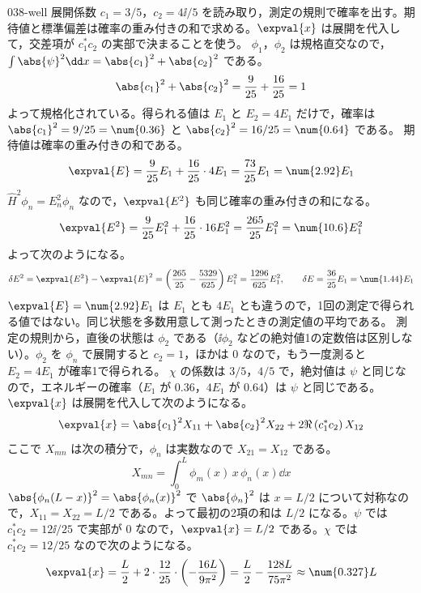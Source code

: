 \documentclass[uplatex,dvipdfmx,a4paper,11pt]{jsarticle}
\begin{document}
\kaitouhen
{}
\begin{kaisetsu}{038-well}
\houshin 展開係数 $c_{1}=3/5$，$c_{2}=4\ii/5$ を読み取り，測定の規則で確率を出す。期待値と標準偏差は確率の重み付きの和で求める。$\expval{x}$ は展開を代入して，交差項が $c_{1}^{*}c_{2}$ の実部で決まることを使う。
\keisan
{} $\phi_{1}$，$\phi_{2}$ は規格直交なので，$\int\abs{\psi}^{2}\dd x=\abs{c_{1}}^{2}+\abs{c_{2}}^{2}$ である。
\[ \abs{c_{1}}^{2}+\abs{c_{2}}^{2}=\frac{9}{25}+\frac{16}{25}=1 \]
よって規格化されている。得られる値は $E_{1}$ と $E_{2}=4E_{1}$ だけで，確率は $\abs{c_{1}}^{2}=9/25=\num{0.36}$ と $\abs{c_{2}}^{2}=16/25=\num{0.64}$ である。
 期待値は確率の重み付きの和である。
\[ \expval{E}=\frac{9}{25}E_{1}+\frac{16}{25}\cdot 4E_{1}=\frac{73}{25}E_{1}=\num{2.92}E_{1} \]
$\hat{H}^{2}\phi_{n}=E_{n}^{2}\phi_{n}$ なので，$\expval{E^{2}}$ も同じ確率の重み付きの和になる。
\[ \expval{E^{2}}=\frac{9}{25}E_{1}^{2}+\frac{16}{25}\cdot 16E_{1}^{2}=\frac{265}{25}E_{1}^{2}=\num{10.6}E_{1}^{2} \]
よって次のようになる。
\[ \delta E^{2}=\expval{E^{2}}-\expval{E}^{2}=\left(\frac{265}{25}-\frac{5329}{625}\right)E_{1}^{2}=\frac{1296}{625}E_{1}^{2},\qquad \delta E=\frac{36}{25}E_{1}=\num{1.44}E_{1} \]
$\expval{E}=\num{2.92}E_{1}$ は $E_{1}$ とも $4E_{1}$ とも違うので，1回の測定で得られる値ではない。同じ状態を多数用意して測ったときの測定値の平均である。
 測定の規則から，直後の状態は $\phi_{2}$ である（$\ii\phi_{2}$ などの絶対値1の定数倍は区別しない）。$\phi_{2}$ を $\phi_{n}$ で展開すると $c_{2}=1$，ほかは $0$ なので，もう一度測ると $E_{2}=4E_{1}$ が確率1で得られる。
 $\chi$ の係数は $3/5$，$4/5$ で，絶対値は $\psi$ と同じなので，エネルギーの確率（$E_{1}$ が $\num{0.36}$，$4E_{1}$ が $\num{0.64}$）は $\psi$ と同じである。$\expval{x}$ は展開を代入して次のようになる。
\[ \expval{x}=\abs{c_{1}}^{2}X_{11}+\abs{c_{2}}^{2}X_{22}+2\Re\left(c_{1}^{*}c_{2}\right)X_{12} \]
ここで $X_{mn}$ は次の積分で，$\phi_{n}$ は実数なので $X_{21}=X_{12}$ である。
\[ X_{mn}=\int_{0}^{L}\phi_{m}(x)\,x\,\phi_{n}(x)\dd x \]
$\abs{\phi_{n}(L-x)}^{2}=\abs{\phi_{n}(x)}^{2}$ で $\abs{\phi_{n}}^{2}$ は $x=L/2$ について対称なので，$X_{11}=X_{22}=L/2$ である。よって最初の2項の和は $L/2$ になる。$\psi$ では $c_{1}^{*}c_{2}=12\ii/25$ で実部が $0$ なので，$\expval{x}=L/2$ である。$\chi$ では $c_{1}^{*}c_{2}=12/25$ なので次のようになる。
\[ \expval{x}=\frac{L}{2}+2\cdot\frac{12}{25}\cdot\left(-\frac{16L}{9\pi^{2}}\right)=\frac{L}{2}-\frac{128L}{75\pi^{2}}\approx\num{0.327}L \]

\end{kaisetsu}
\end{document}
